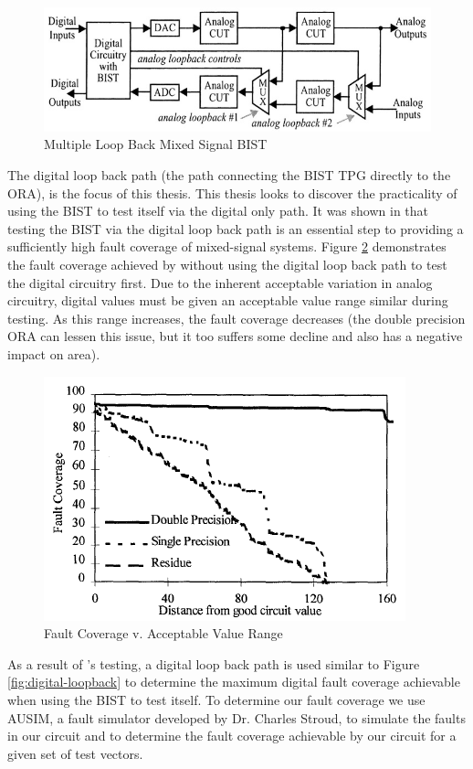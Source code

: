\documentclass[12pt]{report}
\begin{document}
\begin{figure}
	\begin{center}
		\includegraphics[scale=1]{images/mixed-bist-architecture-two}
	\end{center}
	\caption{Multiple Loop Back Mixed Signal BIST\cite{stroud}}
	\label{fig:mixedbist2}
\end{figure}
The digital loop back path (the path connecting the BIST TPG directly to the ORA), is the focus of this thesis.  This thesis looks to discover the practicality of using the BIST to test itself via the digital only path.  It was shown in \cite{stroud-analog} that testing the BIST via the digital loop back path is an essential step to providing a sufficiently high fault coverage of mixed-signal systems.  Figure \ref{fig:analog-faultcvg} demonstrates the fault coverage achieved by \cite{stroud-analog} without using the digital loop back path to test the digital circuitry first.  Due to the inherent acceptable variation in analog circuitry, digital values must be given an acceptable value range similar during testing.  As this range increases, the fault coverage decreases (the double precision ORA can lessen this issue, but it too suffers some decline and also has a negative impact on area).
\begin{figure}[b!]
	\begin{center}
		\includegraphics[scale=.6]{images/analog-fault-coverage}
	\end{center}
	\caption{Fault Coverage v. Acceptable Value Range\cite{stroud-analog}}
	\label{fig:analog-faultcvg}
\end{figure}
As a result of \cite{stroud-analog}'s testing, a digital loop back path is used similar to Figure \ref{fig:digital-loopback} to determine the maximum digital fault coverage achievable when using the BIST to test itself.  To determine our fault coverage we use AUSIM, a fault simulator developed by Dr. Charles Stroud, to simulate the faults in our circuit and to determine the fault coverage achievable by our circuit for a given set of test vectors.  
\end{document}
